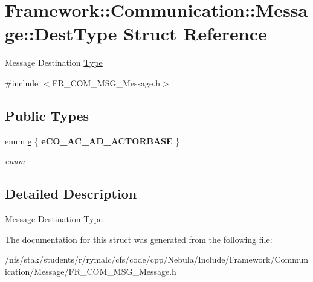 \hypertarget{structFramework_1_1Communication_1_1Message_1_1DestType}{
\section{Framework::Communication::Message::DestType Struct Reference}
\label{structFramework_1_1Communication_1_1Message_1_1DestType}
}


Message Destination \hyperlink{structFramework_1_1Communication_1_1Message_1_1Type}{Type}  


{\ttfamily \#include $<$FR\_\-COM\_\-MSG\_\-Message.h$>$}\subsection*{Public Types}
\begin{DoxyCompactItemize}
\item 
enum \hyperlink{structFramework_1_1Communication_1_1Message_1_1DestType_ad65d11369deab210fbdbdd36cad21372}{e} \{ {\bfseries eCO\_\-AC\_\-AD\_\-ACTORBASE}
 \}
\begin{DoxyCompactList}\small\item\em enum \item\end{DoxyCompactList}\end{DoxyCompactItemize}


\subsection{Detailed Description}
Message Destination \hyperlink{structFramework_1_1Communication_1_1Message_1_1Type}{Type} 

The documentation for this struct was generated from the following file:\begin{DoxyCompactItemize}
\item 
/nfs/stak/students/r/rymalc/cfs/code/cpp/Nebula/Include/Framework/Communication/Message/FR\_\-COM\_\-MSG\_\-Message.h\end{DoxyCompactItemize}
